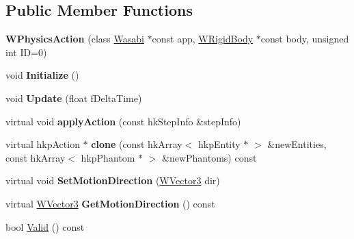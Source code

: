 \subsection*{Public Member Functions}
\begin{DoxyCompactItemize}
\item 
{\bfseries W\+Physics\+Action} (class \hyperlink{class_wasabi}{Wasabi} $\ast$const app, \hyperlink{class_w_rigid_body}{W\+Rigid\+Body} $\ast$const body, unsigned int ID=0)\hypertarget{class_w_physics_action_a0c13f3d8356a71ef44e790c3173bcf07}{}\label{class_w_physics_action_a0c13f3d8356a71ef44e790c3173bcf07}

\item 
void {\bfseries Initialize} ()\hypertarget{class_w_physics_action_a5f10a83329770a3316600b06fe4c9e32}{}\label{class_w_physics_action_a5f10a83329770a3316600b06fe4c9e32}

\item 
void {\bfseries Update} (float f\+Delta\+Time)\hypertarget{class_w_physics_action_a1abe5f88a0302c9437d47b62cc36b7ed}{}\label{class_w_physics_action_a1abe5f88a0302c9437d47b62cc36b7ed}

\item 
virtual void {\bfseries apply\+Action} (const hk\+Step\+Info \&step\+Info)\hypertarget{class_w_physics_action_aedd4a156442f0e5912a4c9ab8556a459}{}\label{class_w_physics_action_aedd4a156442f0e5912a4c9ab8556a459}

\item 
virtual hkp\+Action $\ast$ {\bfseries clone} (const hk\+Array$<$ hkp\+Entity $\ast$ $>$ \&new\+Entities, const hk\+Array$<$ hkp\+Phantom $\ast$ $>$ \&new\+Phantoms) const \hypertarget{class_w_physics_action_aeea1b17b3af0145c993add199a5f9f66}{}\label{class_w_physics_action_aeea1b17b3af0145c993add199a5f9f66}

\item 
virtual void {\bfseries Set\+Motion\+Direction} (\hyperlink{class_w_vector3}{W\+Vector3} dir)\hypertarget{class_w_physics_action_a99760fa333032a97e3b1abd6ab1045d0}{}\label{class_w_physics_action_a99760fa333032a97e3b1abd6ab1045d0}

\item 
virtual \hyperlink{class_w_vector3}{W\+Vector3} {\bfseries Get\+Motion\+Direction} () const \hypertarget{class_w_physics_action_a83af9c3f3d92903b6cbf31eac1520919}{}\label{class_w_physics_action_a83af9c3f3d92903b6cbf31eac1520919}

\item 
bool \hyperlink{class_w_physics_action_a0d9071445335152380fb79a3fd8d651b}{Valid} () const 
\end{DoxyCompactItemize}
